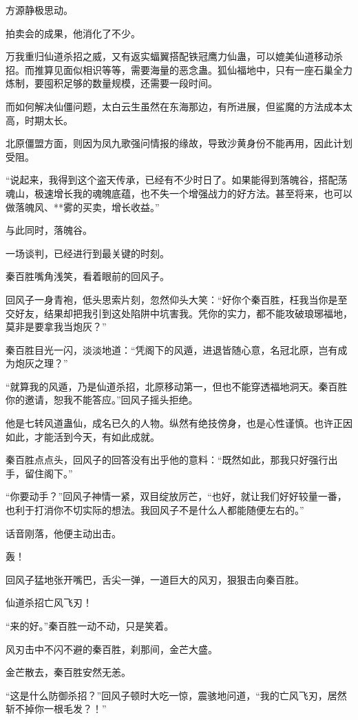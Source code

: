 \begin{this_body}
方源静极思动。

拍卖会的成果，他消化了不少。

万我重归仙道杀招之威，又有返实蝠翼搭配铁冠鹰力仙蛊，可以媲美仙道移动杀招。而推算见面似相识等等，需要海量的恶念蛊。狐仙福地中，只有一座石巢全力炼制，要囤积足够的数量规模，还需要一段时间。

而如何解决仙僵问题，太白云生虽然在东海那边，有所进展，但鲨魔的方法成本太高，时期太长。

北原僵盟方面，则因为凤九歌强问情报的缘故，导致沙黄身份不能再用，因此计划受阻。

“说起来，我得到这个盗天传承，已经有不少时日了。如果能得到落魄谷，搭配荡魂山，极速增长我的魂魄底蕴，也不失一个增强战力的好方法。甚至将来，也可以做落魄风、**雾的买卖，增长收益。”

与此同时，落魄谷。

一场谈判，已经进行到最关键的时刻。

秦百胜嘴角浅笑，看着眼前的回风子。

回风子一身青袍，低头思索片刻，忽然仰头大笑：“好你个秦百胜，枉我当你是至交好友，结果却把我引到这处陷阱中坑害我。凭你的实力，都不能攻破琅琊福地，莫非是要拿我当炮灰？”

秦百胜目光一闪，淡淡地道：“凭阁下的风遁，进退皆随心意，名冠北原，岂有成为炮灰之理？”

“就算我的风遁，乃是仙道杀招，北原移动第一，但也不能穿透福地洞天。秦百胜你的邀请，恕我不能答应。”回风子摇头拒绝。

他是七转风道蛊仙，成名已久的人物。纵然有绝技傍身，也是心性谨慎。也许正因如此，才能活到今天，有如此成就。

秦百胜点点头，回风子的回答没有出乎他的意料：“既然如此，那我只好强行出手，留住阁下。”

“你要动手？”回风子神情一紧，双目绽放厉芒，“也好，就让我们好好较量一番，也利于打消你不切实际的想法。我回风子不是什么人都能随便左右的。”

话音刚落，他便主动出击。

轰！

回风子猛地张开嘴巴，舌尖一弹，一道巨大的风刃，狠狠击向秦百胜。

仙道杀招亡风飞刃！

“来的好。”秦百胜一动不动，只是笑着。

风刃击中不闪不避的秦百胜，刹那间，金芒大盛。

金芒散去，秦百胜安然无恙。

“这是什么防御杀招？”回风子顿时大吃一惊，震骇地问道，“我的亡风飞刃，居然斩不掉你一根毛发？！”


\end{this_body}
